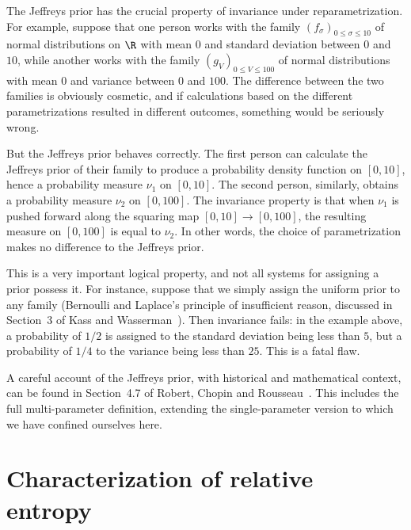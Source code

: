 The Jeffreys prior has the crucial property of invariance%
%
% 
under reparametrization.%
%
%  
For example, suppose that one person works with the family $(f_\sigma)_{0
  \leq \sigma \leq 10}$ of normal distributions on $\R$ with mean $0$ and
standard deviation between $0$ and $10$, while another works with the
family $(g_V)_{0 \leq V \leq 100}$ of normal distributions with mean $0$
and variance between $0$ and $100$.  The difference between the two
families is obviously cosmetic, and if calculations based on the different
parametrizations resulted in different outcomes, something would be
seriously wrong.

But the Jeffreys prior behaves correctly.  The first person
can calculate the Jeffreys prior of their family to produce a probability
density function on $[0, 10]$, hence a probability measure $\nu_1$ on $[0,
  10]$.  The second person, similarly, obtains a probability measure
$\nu_2$ on $[0, 100]$.  The invariance property is that when $\nu_1$ is
pushed forward along the squaring map $[0, 10] \to [0, 100]$, the resulting
measure on $[0, 100]$ is equal to $\nu_2$.  In other words, the choice of
parametrization makes no difference to the Jeffreys prior.  

This is a very important logical property, and not all systems for
assigning a prior possess it.  For instance, suppose that we simply
assign the uniform prior to any family (Bernoulli and Laplace's principle%
% 
%
% 
of insufficient reason, discussed in Section~3 of Kass and
Wasserman~\cite{KaWa}).  Then invariance fails: in the example above, a
probability of $1/2$ is assigned to the standard deviation being less than
$5$, but a probability of $1/4$ to the variance being less than $25$.  This
is a fatal flaw.

A careful account of the Jeffreys prior, with historical and mathematical
context, can be found in Section~4.7 of Robert, Chopin and
Rousseau~\cite{RCR}.  This includes the full multi-parameter definition,
extending the single-parameter version to which we have confined ourselves
here.


\section{Characterization of relative entropy}

